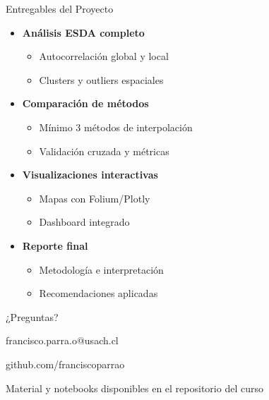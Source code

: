 \documentclass[10pt,aspectratio=169]{beamer}
\newcommand{\conceptbox}[2]{
\begin{tcolorbox}[colframe=usachblue,colback=blue!5,title=#1,fonttitle=\bfseries]
#2
\end{tcolorbox}
}
\begin{document}
\begin{frame}{Entregables del Proyecto}
    \begin{center}
    \conceptbox{Entregables esperados}{
        \begin{itemize}
            \item[\faChartArea] \textbf{Análisis ESDA completo}
                \begin{itemize}
                    \item Autocorrelación global y local
                    \item Clusters y outliers espaciales
                \end{itemize}
            
            \vspace{0.3cm}
            \item[\faLayerGroup] \textbf{Comparación de métodos}
                \begin{itemize}
                    \item Mínimo 3 métodos de interpolación
                    \item Validación cruzada y métricas
                \end{itemize}
            
            \vspace{0.3cm}
            \item[\faChartLine] \textbf{Visualizaciones interactivas}
                \begin{itemize}
                    \item Mapas con Folium/Plotly
                    \item Dashboard integrado
                \end{itemize}
            
            \vspace{0.3cm}
            \item[\faFile] \textbf{Reporte final}
                \begin{itemize}
                    \item Metodología e interpretación
                    \item Recomendaciones aplicadas
                \end{itemize}
        \end{itemize}
    }
    \end{center}
\end{frame}

\begin{frame}[standout]
    \Huge ¿Preguntas?
    
    \vspace{1cm}
    \Large
    \faEnvelope\space francisco.parra.o@usach.cl
    
    \faGithub\space github.com/franciscoparrao
    
    \vspace{1cm}
    \normalsize
    Material y notebooks disponibles en el repositorio del curso
\end{frame}
\end{document}

